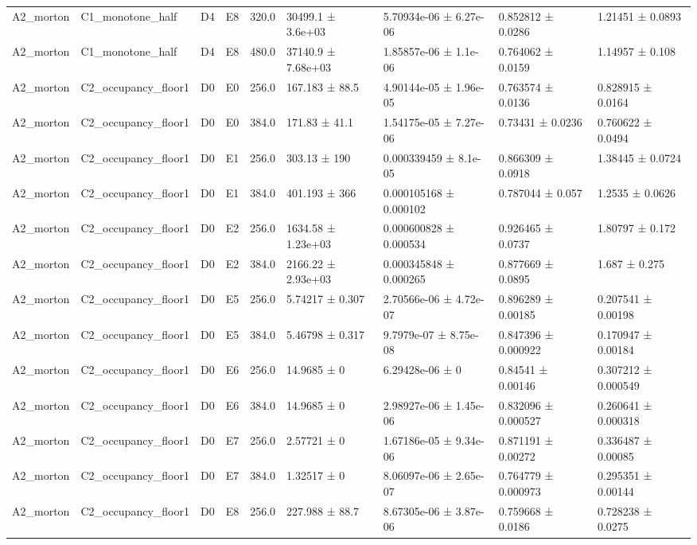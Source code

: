 \begin{table}
\begin{tabular}{lllllllll}
A2\_morton & C1\_monotone\_half & D4 & E8 & 320.0 & 30499.1 ± 3.6e+03 & 5.70934e-06 ± 6.27e-06 & 0.852812 ± 0.0286 & 1.21451 ± 0.0893 \\
A2\_morton & C1\_monotone\_half & D4 & E8 & 480.0 & 37140.9 ± 7.68e+03 & 1.85857e-06 ± 1.1e-06 & 0.764062 ± 0.0159 & 1.14957 ± 0.108 \\
A2\_morton & C2\_occupancy\_floor1 & D0 & E0 & 256.0 & 167.183 ± 88.5 & 4.90144e-05 ± 1.96e-05 & 0.763574 ± 0.0136 & 0.828915 ± 0.0164 \\
A2\_morton & C2\_occupancy\_floor1 & D0 & E0 & 384.0 & 171.83 ± 41.1 & 1.54175e-05 ± 7.27e-06 & 0.73431 ± 0.0236 & 0.760622 ± 0.0494 \\
A2\_morton & C2\_occupancy\_floor1 & D0 & E1 & 256.0 & 303.13 ± 190 & 0.000339459 ± 8.1e-05 & 0.866309 ± 0.0918 & 1.38445 ± 0.0724 \\
A2\_morton & C2\_occupancy\_floor1 & D0 & E1 & 384.0 & 401.193 ± 366 & 0.000105168 ± 0.000102 & 0.787044 ± 0.057 & 1.2535 ± 0.0626 \\
A2\_morton & C2\_occupancy\_floor1 & D0 & E2 & 256.0 & 1634.58 ± 1.23e+03 & 0.000600828 ± 0.000534 & 0.926465 ± 0.0737 & 1.80797 ± 0.172 \\
A2\_morton & C2\_occupancy\_floor1 & D0 & E2 & 384.0 & 2166.22 ± 2.93e+03 & 0.000345848 ± 0.000265 & 0.877669 ± 0.0895 & 1.687 ± 0.275 \\
A2\_morton & C2\_occupancy\_floor1 & D0 & E5 & 256.0 & 5.74217 ± 0.307 & 2.70566e-06 ± 4.72e-07 & 0.896289 ± 0.00185 & 0.207541 ± 0.00198 \\
A2\_morton & C2\_occupancy\_floor1 & D0 & E5 & 384.0 & 5.46798 ± 0.317 & 9.7979e-07 ± 8.75e-08 & 0.847396 ± 0.000922 & 0.170947 ± 0.00184 \\
A2\_morton & C2\_occupancy\_floor1 & D0 & E6 & 256.0 & 14.9685 ± 0 & 6.29428e-06 ± 0 & 0.84541 ± 0.00146 & 0.307212 ± 0.000549 \\
A2\_morton & C2\_occupancy\_floor1 & D0 & E6 & 384.0 & 14.9685 ± 0 & 2.98927e-06 ± 1.45e-06 & 0.832096 ± 0.000527 & 0.260641 ± 0.000318 \\
A2\_morton & C2\_occupancy\_floor1 & D0 & E7 & 256.0 & 2.57721 ± 0 & 1.67186e-05 ± 9.34e-06 & 0.871191 ± 0.00272 & 0.336487 ± 0.00085 \\
A2\_morton & C2\_occupancy\_floor1 & D0 & E7 & 384.0 & 1.32517 ± 0 & 8.06097e-06 ± 2.65e-07 & 0.764779 ± 0.000973 & 0.295351 ± 0.00144 \\
A2\_morton & C2\_occupancy\_floor1 & D0 & E8 & 256.0 & 227.988 ± 88.7 & 8.67305e-06 ± 3.87e-06 & 0.759668 ± 0.0186 & 0.728238 ± 0.0275 \\

\end{tabular}
\end{table}
